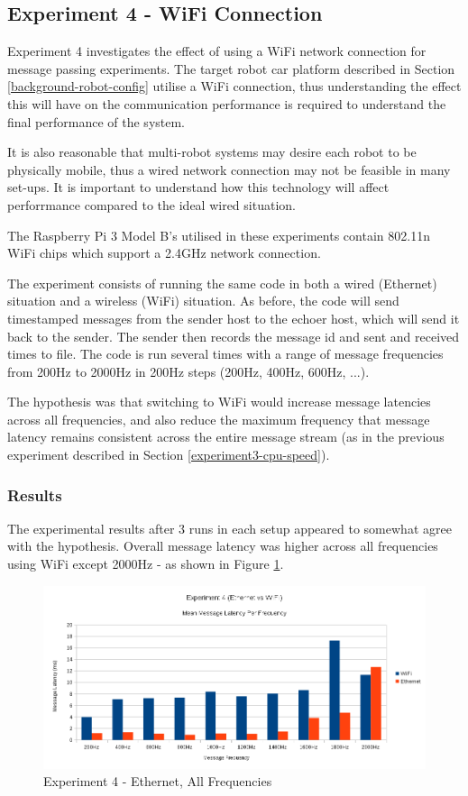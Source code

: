 \documentclass[../dissertation.tex]{subfiles}
\begin{document}
\subsection{Experiment 4 - WiFi Connection}

Experiment 4 investigates the effect of using a WiFi network connection for message passing experiments. The target robot car platform described in Section \ref{background-robot-config} utilise a WiFi connection, thus understanding the effect this will have on the communication performance is required to understand the final performance of the system.

It is also reasonable that multi-robot systems may desire each robot to be physically mobile, thus a wired network connection may not be feasible in many set-ups. It is important to understand how this technology will affect perforrmance compared to the ideal wired situation.

The Raspberry Pi 3 Model B's utilised in these experiments contain 802.11n WiFi chips which support a 2.4GHz network connection.

The experiment consists of running the same code in both a wired (Ethernet) situation and a wireless (WiFi) situation. As before, the code will send timestamped messages from the sender host to the echoer host, which will send it back to the sender. The sender then records the message id and sent and received times to file. The code is run several times with a range of message frequencies from 200Hz to 2000Hz in 200Hz steps (200Hz, 400Hz, 600Hz, ...).

The hypothesis was that switching to WiFi would increase message latencies across all frequencies, and also reduce the maximum frequency that message latency remains consistent across the entire message stream (as in the previous experiment described in Section \ref{experiment3-cpu-speed}).

\subsubsection{Results}

The experimental results after 3 runs in each setup appeared to somewhat agree with the hypothesis. Overall message latency was higher across all frequencies using WiFi except 2000Hz - as shown in Figure \ref{exp4-means-all-freq}.

\begin{figure}[H]
\centering
\includegraphics[width=\textwidth]{images/experiment4/mean_per_frequency.png}
\caption{Experiment 4 - Ethernet, All Frequencies}
\label{exp4-means-all-freq}
\end{figure}
\end{document}

